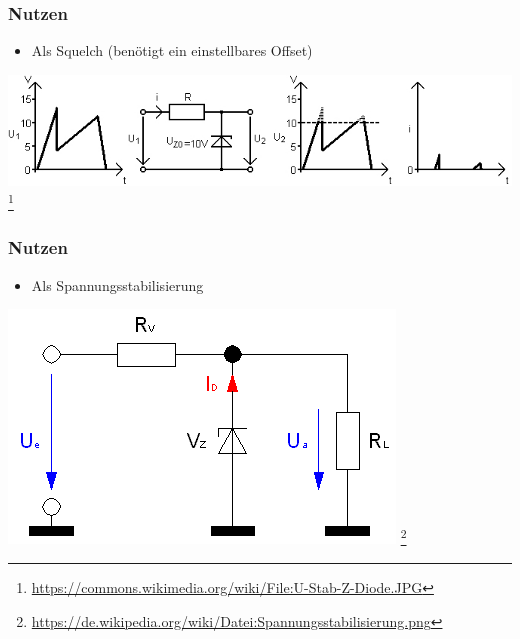 \begin{frame}
    \frametitle{Nutzen}
      	\begin{itemize}
			\item Als Squelch (benötigt ein einstellbares Offset)
    \end{itemize}    
    \begin{center}
        \includegraphics[width=.8\textwidth]{e12/U-Stab-Z-Diode.jpg}
        \footnote{\tiny \url{https://commons.wikimedia.org/wiki/File:U-Stab-Z-Diode.JPG}}
	\end{center}
\end{frame}

\begin{frame}
    \frametitle{Nutzen}
      	\begin{itemize}
			\item Als Spannungsstabilisierung
    \end{itemize}    
    \begin{center}
        \includegraphics[width=.8\textwidth]{e12/Spannungsstabilisierung.png}
        \footnote{\tiny \url{https://de.wikipedia.org/wiki/Datei:Spannungsstabilisierung.png}}
	\end{center}
\end{frame}

